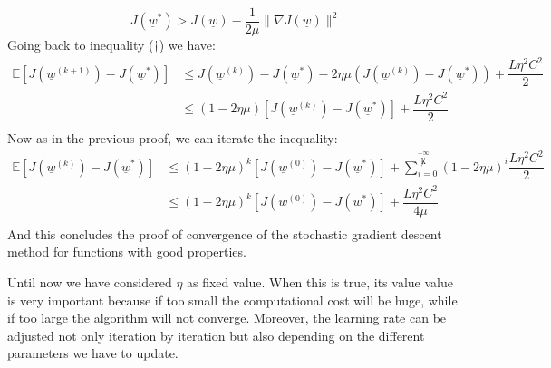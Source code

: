 \[
    J(\underline{w}^*) > J(\underline{w}) - \dfrac{1}{2 \mu} \|\nabla J(\underline{w})\|^2
\]
Going back to inequality ($\dagger$) we have:
\[
    \begin{split}
        \mathbb{E}[J(\underline{w}^{(k+1)}) - J(\underline{w}^*)] &\leq J(\underline{w}^{(k)}) - J(\underline{w}^*) - 2\eta\mu (J(\underline{w}^{(k)}) - J(\underline{w}^*)) + \dfrac{L\eta^2 C^2}{2}\\ 
        &\leq (1-2\eta \mu) [J(\underline{w}^{(k)}) - J(\underline{w}^*)] + \dfrac{L\eta^2 C^2}{2}\\
    \end{split}    
\]
Now as in the previous proof, we can iterate the inequality:
\[
    \begin{split}
        \mathbb{E}[J(\underline{w}^{(k)}) - J(\underline{w}^*)] &\leq (1-2\eta \mu)^k [J(\underline{w}^{(0)}) - J(\underline{w}^*)] + \sum_{i=0}^{\overset{+\infty}{\not k}} (1-2\eta \mu)^i \dfrac{L\eta^2 C^2}{2}\\
        &\leq (1-2\eta \mu)^k [J(\underline{w}^{(0)}) - J(\underline{w}^*)] + \dfrac{L\eta^2 C^2}{4\mu}\\
    \end{split}
\]
And this concludes the proof of convergence of the stochastic gradient descent method for functions with good properties. 

Until now we have considered $\eta$ as fixed value. When this is true, its value value is very important because if too small the computational cost will be huge, while if too large the algorithm will not converge. Moreover, the learning rate can be adjusted not only iteration by iteration but also depending on the different parameters we have to update.

